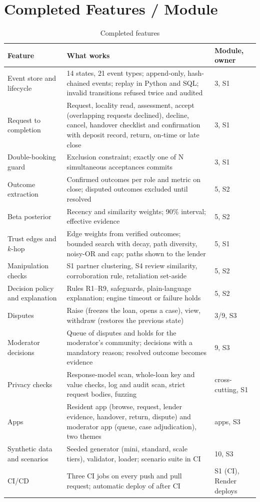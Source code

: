 \section{Completed Features / Module}\label{sec:completed-features-module}
\begin{table}[H]
\centering
\small
\caption{Completed features}\label{tab:completed-features}
\begin{tabular}{@{}L{98pt}L{209pt}L{68pt}@{}}
\toprule
Feature & What works & Module, owner \\
\midrule
Event store and lifecycle & 14 states, 21 event types; append-only, hash-chained events; replay in Python and SQL; invalid transitions refused twice and audited & 3, S1 \\
Request to completion & Request, locality read, assessment, accept (overlapping requests declined), decline, cancel, handover checklist and confirmation with deposit record, return, on-time or late close & 3, S1 \\
Double-booking guard & Exclusion constraint; exactly one of N simultaneous acceptances commits & 3, S1 \\
Outcome extraction & Confirmed outcomes per role and metric on close; disputed outcomes excluded until resolved & 5, S2 \\
Beta posterior & Recency and similarity weights; 90\% interval; effective evidence & 5, S2 \\
Trust edges and $k$-hop & Edge weights from verified outcomes; bounded search with decay, path diversity, noisy-OR and cap; paths shown to the lender & 5, S1 \\
Manipulation checks & S1 partner clustering, S4 review similarity, corroboration rule, retaliation set-aside & 5, S2 \\
Decision policy and explanation & Rules R1--R9, safeguards, plain-language explanation; engine timeout or failure holds & 5, S2 \\
Disputes & Raise (freezes the loan, opens a case), view, withdraw (restores the previous state) & 3/9, S3 \\
Moderator decisions & Queue of disputes and holds for the moderator's community; decisions with a mandatory reason; resolved outcome becomes evidence & 9, S3 \\
Privacy checks & Response-model scan, whole-loan key and value checks, log and audit scan, strict request bodies, fuzzing & cross-cutting, S1 \\
Apps & Resident app (browse, request, lender evidence, handover, return, dispute) and moderator app (queue, case adjudication), two themes & apps, S3 \\
Synthetic data and scenarios & Seeded generator (mini, standard, scale tiers), validator, loader; scenario suite in CI & 10, S3 \\
CI/CD & Three CI jobs on every push and pull request; automatic deploy of  after CI & S1 (CI), Render deploys \\
\bottomrule
\end{tabular}
\end{table}

